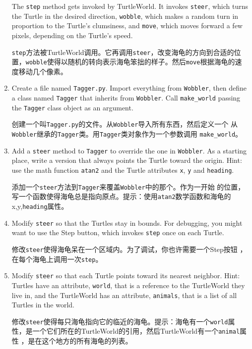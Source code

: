 \documentclass[10pt]{book}
\begin{document}
\begin{CJK}{UTF8}{gbsn}
\begin{exercise}
\begin{enumerate}
The {\tt step} method gets invoked by TurtleWorld.  It invokes 
{\tt steer}, which turns the Turtle in the desired direction,
{\tt wobble}, which makes a random turn in proportion to the Turtle's
clumsiness, and {\tt move}, which moves forward a few pixels,
depending on the Turtle's speed.

{\tt step}方法被TurtleWorld调用。它再调用{\tt steer}，改变海龟的方向到合适的位
置，{\tt wobble}使得以随机的转向表示海龟笨拙的样子。然后{\tt move}根据海龟的速
度移动几个像素。

\item Create a file named {\tt Tagger.py}.  Import everything from
  {\tt Wobbler}, then define a class named {\tt Tagger} that inherits
  from {\tt Wobbler}.  Call \verb"make_world" passing the {\tt Tagger} 
  class object as an argument.

    创建一个叫{\tt Tagger.py}的文件。从{\tt Wobbler}导入所有东西，然后定义一个
    从{\tt Wobbler}继承的{\tt Tagger}类。用{\tt Tagger}类对象作为一个参数调用
    \verb"make_world"。

\item Add a {\tt steer} method to {\tt Tagger} to override the one in
  {\tt Wobbler}.  As a starting place, write a version that always
  points the Turtle toward the origin.  Hint: use the math function
  {\tt atan2} and the Turtle attributes {\tt x}, {\tt y} and
  {\tt heading}.

  添加一个{\tt steer}方法到{\tt Tagger}来覆盖{\tt Wobbler}中的那个。作为一开始
  的位置，写一个函数使得海龟总是指向原点。提示：使用{\tt atan2}数学函数和海龟的
  x,y,{\tt heading}属性。

\item Modify {\tt steer} so that the Turtles stay in bounds.
  For debugging, you might want to use the {\sf Step} button,
  which invokes {\tt step} once on each Turtle.

  修改{\tt steer}使得海龟呆在一个区域内。为了调试，你也许需要一个{\sf Step}按钮
  ，在每个海龟上调用一次{\tt step}。

\item Modify {\tt steer} so that each Turtle points toward its nearest
  neighbor.  Hint: Turtles have an attribute, {\tt world}, that is a
  reference to the TurtleWorld they live in, and the TurtleWorld has
  an attribute, {\tt animals}, that is a list of all Turtles in the
  world.

  修改{\tt steer}使得每只海龟指向它的临近的海龟。提示：海龟有一个{\tt world}属
  性，是一个它们所在的TurtleWorld的引用，然后TurtleWorld有一个{\tt animal}属性
  ，是在这个地方的所有海龟的列表。


\end{enumerate}
\end{exercise}
\end{CJK}
\end{document}
